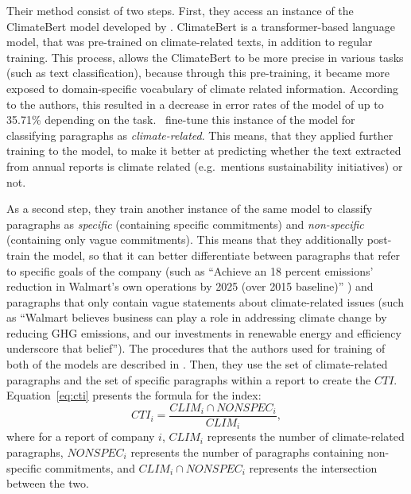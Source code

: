 \documentclass[12pt]{article}
\begin{document}
Their method consist of two steps. First, they access an instance of the ClimateBert model developed by \textcite{webersinkeCLIMATEBERTPretrainedLanguage2022}. ClimateBert is a transformer-based language model, that was pre-trained on climate-related texts, in addition to regular training. This process, allows the ClimateBert to be more precise in various tasks (such as text classification), because through this pre-training, it became more exposed to domain-specific vocabulary of climate related information. According to the authors, this resulted in a decrease in error rates of the model of up to 35.71\% depending on the task.~\citeauthor{binglerHowCheapTalk2024} fine-tune this instance of the model for classifying paragraphs as \textit{climate-related}. This means, that they applied further training to the model, to make it better at predicting whether the text extracted from annual reports is climate related (e.g.~mentions sustainability initiatives) or not. 

As a second step, they train another instance of the same model to classify paragraphs as \textit{specific} (containing specific commitments) and \textit{non-specific} (containing only vague commitments). This means that they additionally post-train the model, so that it can better differentiate between paragraphs that refer to specific goals of the company (such as ``Achieve an 18 percent emissions' reduction in Walmart's own operations by 2025 (over 2015 baseline)'' \parencite{walmart2018csr}) and paragraphs that only contain vague statements about climate-related issues (such as ``Walmart believes business can play a role in addressing climate change by reducing GHG emissions, and our investments in renewable energy and efficiency underscore that belief''). The procedures that the authors used for training of both of the models are described in \textcite{binglerCheapTalkCherrypicking2022,binglerHowCheapTalk2024}. Then, they use the set of climate-related paragraphs and the set of specific paragraphs within a report to create the $CTI$. Equation~\ref{eq:cti} presents the formula for the index:
\begin{equation}\label{eq:cti}
    CTI_i = \frac{CLIM_i \cap NONSPEC_i}{CLIM_{i}},
\end{equation}
where for a report of company $i$, $CLIM_i$ represents the number of climate-related paragraphs, $NONSPEC_i$ represents the number of paragraphs containing non-specific commitments, and $CLIM_i \cap NONSPEC_i$ represents the intersection between the two. 
\end{document}
